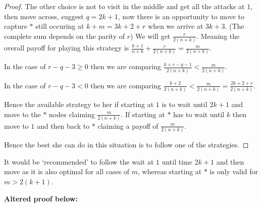 \documentclass[a4paper,10pt]{article}
\theoremstyle{definition}
\theoremstyle{definition}
\theoremstyle{remark}
\theoremstyle{definition}
\begin{document}
\begin{proof}
The other choice is not to visit in the middle and get all the attacks at $1$, then move across, suggest $q=2k+1$, now there is an opportunity to move to capture $*$ still occuring at $k+m=3k+2+r$ when we arrive at $3k+3$. (The complete sum depends on the parity of $r$)
We will get $\frac{r}{2(n+k)}$.
Meaning the overall payoff for playing this strategy is $\frac{k+1}{n+k}+\frac{r}{2(n+k)}=\frac{m}{2(n+k)}$.

In the case of $r-q-3 \geq 0$ then we are comparing $\frac{k+r-q-1}{2(n+k)} < \frac{m}{2(n+k)}$.

In the case of $r-q-3 < 0 $ then we are comparing $\frac{k+2}{2(n+k)} < \frac{m}{2(n+k)}=\frac{2k+2+r}{2(n+k)}$.

Hence the available strategy to her if starting at $1$ is to wait until $2k+1$ and move to the $*$ nodes claiming $\frac{m}{2(n+k)}$. If starting at $*$ has to wait until $k$ then move to $1$ and then back to $*$ claiming a payoff of $\frac{m}{2(n+k)}$.

Hence the best she can do in this situation is to follow one of the strategies.  
\end{proof}

It would be `recommended' to follow the wait at $1$ until time $2k+1$ and then move as it is also optimal for all cases of $m$, whereas starting at $*$ is only valid for $m > 2(k+1)$. 

\textbf{Altered proof below:}
\end{document}
